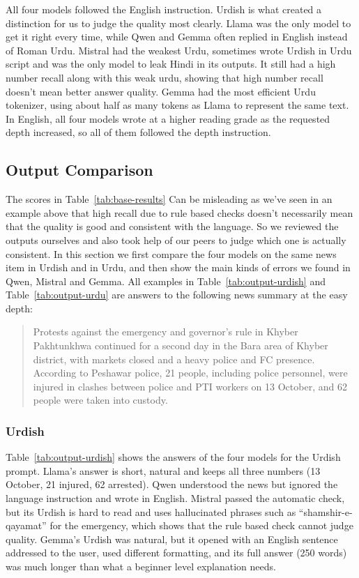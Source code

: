 \documentclass{FastFyp}
\begin{document}
All four models followed the English instruction. Urdish is what created a distinction for us to judge the quality most clearly. Llama was the only model to get it right every time, while Qwen and Gemma often replied in English instead of Roman Urdu. Mistral had the weakest Urdu, sometimes wrote Urdish in Urdu script and was the only model to leak Hindi in its outputs. It still had a high number recall along with this weak urdu, showing that high number recall doesn't mean better answer quality. Gemma had the most efficient Urdu tokenizer, using about half as many tokens as Llama to represent the same text. In English, all four models wrote at a higher reading grade as the requested depth increased, so all of them followed the depth instruction.

\subsection{Output Comparison}
The scores in Table~\ref{tab:base-results} Can be misleading as we've seen in an example above that high recall due to rule based checks doesn't necessarily mean that the quality is good and consistent with the language. So we reviewed the outputs ourselves and also took help of our peers to judge which one is actually consistent. In this section we first compare the four models on the same news item in Urdish and in Urdu, and then show the main kinds of errors we found in Qwen, Mistral and Gemma. All examples in Table~\ref{tab:output-urdish} and Table~\ref{tab:output-urdu} are answers to the following news summary at the easy depth:

\begin{quote}\small
Protests against the emergency and governor's rule in Khyber Pakhtunkhwa continued for a second day in the Bara area of Khyber district, with markets closed and a heavy police and FC presence. According to Peshawar police, 21 people, including police personnel, were injured in clashes between police and PTI workers on 13 October, and 62 people were taken into custody.
\end{quote}


\subsubsection{Urdish}
Table~\ref{tab:output-urdish} shows the answers of the four models for the Urdish prompt. Llama's answer is short, natural and keeps all three numbers (13 October, 21 injured, 62 arrested). Qwen understood the news but ignored the language instruction and wrote in English. Mistral passed the automatic check, but its Urdish is hard to read and uses hallucinated phrases such as ``shamshir-e-qayamat'' for the emergency, which shows that the rule based check cannot judge quality. Gemma's Urdish was natural, but it opened with an English sentence addressed to the user, used different formatting, and its full answer (250 words) was much longer than what a beginner level explanation needs.
\end{document}

